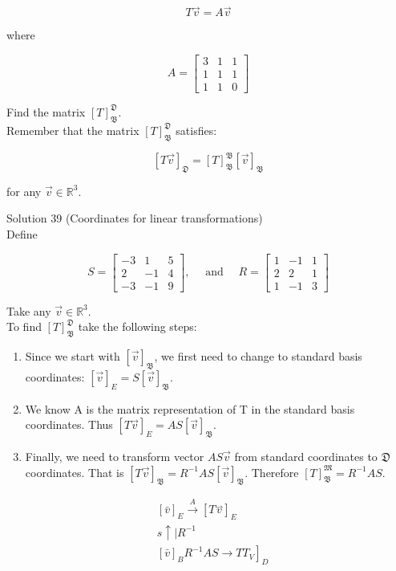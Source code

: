 \documentclass[10pt]{article}
\begin{document}
$$
T \vec{v}=A \vec{v}
$$

where

$$
A=\left[\begin{array}{lll}
3 & 1 & 1 \\
1 & 1 & 1 \\
1 & 1 & 0
\end{array}\right]
$$

Find the matrix $[T]_{\mathfrak{B}}^{\mathfrak{D}}$.\\
Remember that the matrix $[T]_{\mathfrak{B}}^{\mathfrak{D}}$ satisfies:

$$
[T \vec{v}]_{\mathfrak{D}}=[T]_{\mathfrak{B}}^{\mathfrak{B}}[\vec{v}]_{\mathfrak{B}}
$$

for any $\vec{v} \in \mathbb{R}^{3}$.

Solution 39 (Coordinates for linear transformations)\\
Define

$$
S=\left[\begin{array}{ccc}
-3 & 1 & 5 \\
2 & -1 & 4 \\
-3 & -1 & 9
\end{array}\right], \quad \text { and } \quad R=\left[\begin{array}{ccc}
1 & -1 & 1 \\
2 & 2 & 1 \\
1 & -1 & 3
\end{array}\right]
$$

Take any $\vec{v} \in \mathbb{R}^{3}$.\\
To find $[T]_{\mathfrak{B}}^{\mathfrak{D}}$ take the following steps:

\begin{enumerate}
  \item Since we start with $[\vec{v}]_{\mathfrak{B}}$, we first need to change to standard basis coordinates: $[\vec{v}]_{E}=S[\vec{v}]_{\mathfrak{B}}$.
  \item We know A is the matrix representation of T in the standard basis coordinates. Thus $[T \vec{v}]_{E}=A S[\vec{v}]_{\mathfrak{B}}$.
  \item Finally, we need to transform vector $A S \vec{v}$ from standard coordinates to $\mathfrak{D}$ coordinates. That is $[T \vec{v}]_{\mathfrak{B}}=R^{-1} A S[\vec{v}]_{\mathfrak{B}}$. Therefore $[T]_{\mathfrak{B}}^{\mathfrak{M}}=R^{-1} A S$.
\end{enumerate}

$$
\begin{aligned}
& {[\bar{v}]_{E} \xrightarrow{A}[T \stackrel{\rightharpoonup}{v}]_{E}} \\
& s \uparrow \mid R^{-1} \\
& \left.[\bar{v}]_{B} R^{-1} A S \rightarrow T T_{V}\right]_{D}
\end{aligned}
$$
\end{document}
